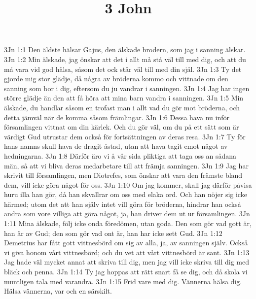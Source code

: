 

\title{3 John}

3Jn 1:1  Den äldste hälsar Gajus, den älskade brodern, som jag i sanning älskar.
3Jn 1:2  Min älskade, jag önskar att det i allt må stå väl till med dig, och att du må vara vid god hälsa, såsom det ock står väl till med din själ.
3Jn 1:3  Ty det gjorde mig stor glädje, då några av bröderna kommo och vittnade om den sanning som bor i dig, eftersom du ju vandrar i sanningen.
3Jn 1:4  Jag har ingen större glädje än den att få höra att mina barn vandra i sanningen.
3Jn 1:5  Min älskade, du handlar såsom en trofast man i allt vad du gör mot bröderna, och detta jämväl när de komma såsom främlingar.
3Jn 1:6  Dessa hava nu inför församlingen vittnat om din kärlek. Och du gör väl, om du på ett sätt som är värdigt Gud utrustar dem också för fortsättningen av deras resa.
3Jn 1:7  Ty för hans namns skull hava de dragit åstad, utan att hava tagit emot något av hedningarna.
3Jn 1:8  Därför äro vi å vår sida pliktiga att taga oss an sådana män, så att vi bliva deras medarbetare till att främja sanningen.
3Jn 1:9  Jag har skrivit till församlingen, men Diotrefes, som önskar att vara den främste bland dem, vill icke göra något för oss.
3Jn 1:10  Om jag kommer, skall jag därför påvisa huru illa han gör, då han skvallrar om oss med elaka ord. Och han nöjer sig icke härmed; utom det att han själv intet vill göra för bröderna, hindrar han också andra som vore villiga att göra något, ja, han driver dem ut ur församlingen.
3Jn 1:11  Mina älskade, följ icke onda föredömen, utan goda. Den som gör vad gott är, han är av Gud; den som gör vad ont är, han har icke sett Gud.
3Jn 1:12  Demetrius har fått gott vittnesbörd om sig av alla, ja, av sanningen själv. Också vi giva honom vårt vittnesbörd; och du vet att vårt vittnesbörd är sant.
3Jn 1:13  Jag hade väl mycket annat att skriva till dig, men jag vill icke skriva till dig med bläck och penna.
3Jn 1:14  Ty jag hoppas att rätt snart få se dig, och då skola vi muntligen tala med varandra.
3Jn 1:15  Frid vare med dig. Vännerna hälsa dig. Hälsa vännerna, var och en särskilt.


